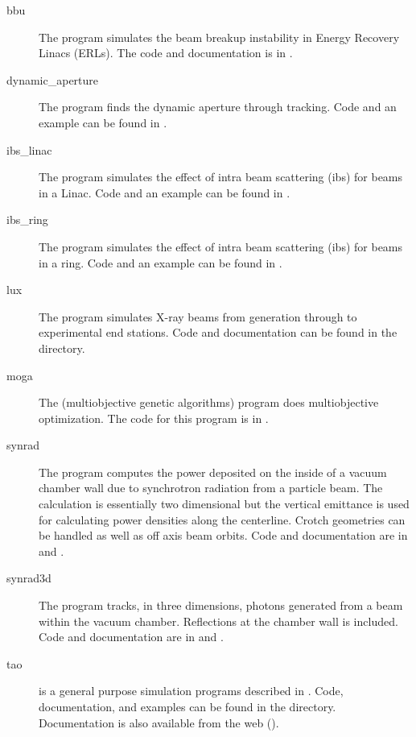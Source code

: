 \documentclass{hitec}
\begin{document}
  \begin{description}
  \item[bbu] \Newline
The  program simulates the beam breakup instability in Energy Recovery Linacs (ERLs).
The  code and documentation is in .
  \item[dynamic_aperture] \Newline
The  program finds the dynamic aperture through tracking. Code and an
example can be found in .
  \item[ibs_linac] \Newline
The  program simulates the effect of intra beam scattering (ibs) for beams
in a Linac. Code and an example can be found in .
  \item[ibs_ring] \Newline
The  program simulates the effect of intra beam scattering (ibs) for beams
in a ring. Code and an example can be found in .
  \item[lux] \Newline
The  program simulates X-ray beams from generation through to experimental end stations.
Code and documentation can be found in the  directory.
  \item[moga] \Newline
The  (multiobjective genetic algorithms) program does multiobjective
optimization. The code for this program is in .
  \item[synrad] \Newline
The  program computes the power deposited on the inside of a vacuum chamber
wall due to synchrotron radiation from a particle beam. The calculation is essentially two
dimensional but the vertical emittance is used for calculating power densities along the
centerline. Crotch geometries can be handled as well as off axis beam orbits. Code and
documentation are in  and . 
  \item[synrad3d] \Newline
The  program tracks, in three dimensions, photons generated from a beam
within the vacuum chamber. Reflections at the chamber wall is included. Code and
documentation are in  and .
  \item[tao] \Newline
\tao is a general purpose simulation programs described in . Code,
documentation, and examples can be found in the  directory. Documentation is also
available from the web ().
  \end{description}

\end{document}
